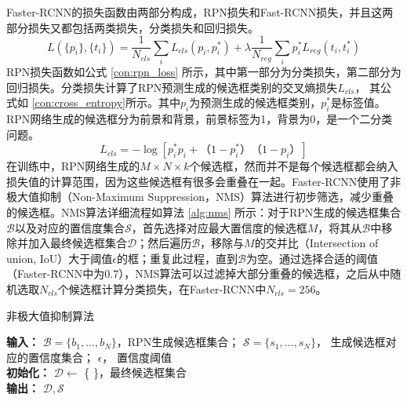 Faster-RCNN的损失函数由两部分构成，RPN损失和Fast-RCNN损失，并且这两部分损失又都包括两类损失，分类损失和回归损失。
\begin{equation}
L(\{p_i\},\{t_i\}) =\frac{1}{N_{cls}} \sum_{i}L_{cls}(p_i, p^*_i) + \lambda \frac{1}{N_{reg}} \sum_{i} p^*_i L_{reg}(t_i,t^*_i)
\label{con:rpn_loss}
\end{equation}
RPN损失函数如公式 \ref{con:rpn_loss} 所示，其中第一部分为分类损失，第二部分为回归损失。分类损失计算了RPN预测生成的候选框类别的交叉熵损失$L_{cls}$， 其公式如 \ref{con:cross_entropy}所示。其中$p_i$为预测生成的候选框类别，$p^*_i$是标签值。RPN网络生成的候选框分为前景和背景，前景标签为1，背景为0，是一个二分类问题。
\begin{equation}
L_{cls} = -\log[p^*_ip_i + （1-p^*_i）（1-p_i）]
\label{con:cross_entropy}
\end{equation}
在训练中，RPN网络生成的$M \times N \times k$个候选框，然而并不是每个候选框都会纳入损失值的计算范围，因为这些候选框有很多会重叠在一起。Faster-RCNN使用了非极大值抑制（Non-Maximum Suppression，NMS）算法进行初步筛选，减少重叠的候选框。NMS算法详细流程如算法 \ref{alg:nms} 所示：对于RPN生成的候选框集合 $\mathcal{B}$以及对应的置信度集合$\mathcal{S}$，首先选择对应最大置信度的候选框$M$，将其从$\mathcal{B}$中移除并加入最终候选框集合$\mathcal{D}$；然后遍历$\mathcal{B}$，移除与$M$的交并比（Intersection of union, IoU）大于阈值$\epsilon$的框；重复此过程，直到$\mathcal{B}$为空。通过选择合适的阈值（Faster-RCNN中为0.7），NMS算法可以过滤掉大部分重叠的候选框，之后从中随机选取$N_{cls}$个候选框计算分类损失，在Faster-RCNN中$N_{cls} = 256$。
\begin{algorithm}[t]
	\caption{非极大值抑制算法}
	\label{alg:nms}
	\textbf{输入： } $\mathcal{B}=\{b_1,...,b_N\}$，RPN生成候选框集合； $\mathcal{S}=\{s_1,...,s_N\}$， 生成候选框对应的置信度集合； $\epsilon$， 置信度阈值 \\
	\textbf{初始化：} $\mathcal{D} \leftarrow$ \{ \}，最终候选框集合 \\
	\textbf{输出： } $\mathcal{D},\mathcal{S}$
\end{algorithm}


